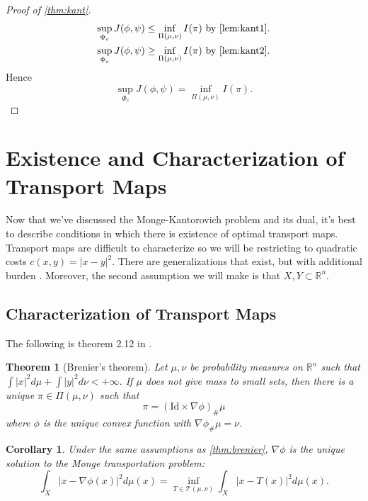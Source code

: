 \documentclass[12pt]{article}
\newcommand{\R}{\mathbb{R}}
\theoremstyle{plain}
\newtheorem{thm}{Theorem}[section]
\newtheorem{cor}{Corollary}[section]
\numberwithin{equation}{section}
\begin{document}
\begin{proof}[Proof of \autoref{thm:kant}]
  \begin{align*}
    \sup_{\Phi_c}J(\phi,\psi)\le \inf_{\Pi(\mu,\nu)}I(\pi) &\,\,\text{by \autoref{lem:kant1}}. \\
    \sup_{\Phi_c}J(\phi,\psi)\ge \inf_{\Pi(\mu,\nu)}I(\pi) &\,\,\text{by \autoref{lem:kant2}}.
  \end{align*}
  Hence
  \[ \sup_{\Phi_c}J(\phi,\psi)= \inf_{\Pi(\mu,\nu)}I(\pi).\]
\end{proof}
\section{Existence and Characterization of Transport Maps}
Now that we've discussed the Monge-Kantorovich problem and its dual, it's best to describe conditions in which there is existence of optimal transport maps. Transport maps are difficult to characterize 
so we will be restricting to quadratic costs $c(x,y)=|x-y|^2$. There are generalizations that exist, but with additional burden \cite{thorpe}. Moreover, the second assumption we will make is that $X,Y\subset \R^n$. 
\subsection{Characterization of Transport Maps}

The following is theorem 2.12 in \cite{villani}.
\begin{thm}[Brenier's theorem]\label{thm:brenier}
Let $\mu,\nu$ be probability measures on $\R^n$ such that $\int |x|^2 d\mu + \int |y|^2d\nu < +\infty$. If $\mu$ does not give mass to small sets, then there is a unique $\pi\in\Pi(\mu,\nu)$ such that 
\[\pi = (\text{Id}\times \nabla \phi)_\#\mu\]
where $\phi$ is the unique convex function with $\nabla\phi_\#\mu = \nu$.
\end{thm}
\begin{cor}\label{cor:transport}
  Under the same assumptions as \autoref{thm:brenier}, $\nabla\phi$ is the unique solution to the Monge transportation problem:
  \[\int_X|x-\nabla\phi(x)|^2d\mu(x) = \inf_{T\in\mathcal{T}(\mu,\nu)}\int_X|x-T(x)|^2d\mu(x).\]
\end{cor}
\end{document}

